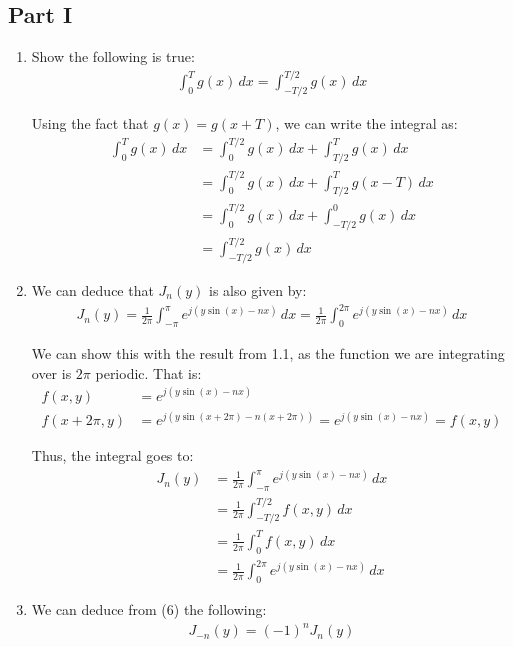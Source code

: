 \documentclass{article}
\begin{document}
\subsection{Part I}
\begin{enumerate}[label=1.\arabic*]
    \item Show the following is true:
    \begin{align*}
        \int_{0}^{T} g(x) \, dx = \int_{-T/2}^{T/2} g(x) \, dx
    \end{align*}

    Using the fact that $g(x) = g(x+T)$, we can write the integral as:
    \begin{align*}
        \int_{0}^{T} g(x) \, dx &= \int_{0}^{T/2} g(x) \, dx + \int_{T/2}^{T} g(x) \, dx \\
        &= \int_{0}^{T/2} g(x) \, dx + \int_{T/2}^{T} g(x-T) \, dx \\
        &= \int_{0}^{T/2} g(x) \, dx + \int_{-T/2}^{0} g(x) \, dx \\
        &= \int_{-T/2}^{T/2} g(x) \, dx
    \end{align*}

    \item We can deduce that $J_n(y)$ is also given by:
    \begin{align*}
        J_n(y) = \frac{1}{2\pi} \int_{-\pi}^{\pi} e^{j(y\sin(x)-nx)} \, dx = \frac{1}{2\pi} \int_{0}^{2\pi} e^{j(y\sin(x)-nx)} \, dx
    \end{align*}

    We can show this with the result from 1.1, as the function we are integrating over is $2\pi$ periodic. That is:
    \begin{align*}
        f(x, y) &= e^{j(y\sin(x)-nx)} \\
        f(x+2\pi, y) &= e^{j(y\sin(x+2\pi)-n(x+2\pi))} = e^{j(y\sin(x)-nx)} = f(x, y)
    \end{align*}

    Thus, the integral goes to:
    \begin{align*}
        J_n(y) &= \frac{1}{2\pi} \int_{-\pi}^{\pi} e^{j(y\sin(x)-nx)} \, dx \\
        &= \frac{1}{2\pi} \int_{-T/2}^{T/2} f(x, y) \, dx \\
        &= \frac{1}{2\pi} \int_{0}^{T} f(x, y) \, dx \\
        &= \frac{1}{2\pi} \int_{0}^{2\pi} e^{j(y\sin(x)-nx)} \, dx
    \end{align*}

    \item We can deduce from (6) the following:
    \begin{align*}
        J_{-n}(y) = (-1)^n J_n(y)
    \end{align*}


\end{enumerate}
\end{document}
